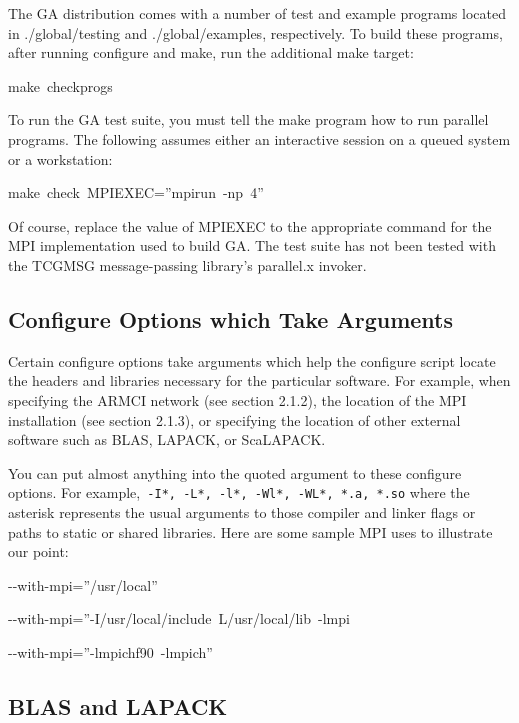 The GA distribution comes with a number of test and example programs
located in ./global/testing and ./global/examples, respectively. To
build these programs, after running configure and make, run the additional
make target: 
\begin{lyxcode}
make~checkprogs~
\end{lyxcode}
To run the GA test suite, you must tell the make program how to run
parallel programs. The following assumes either an interactive session
on a queued system or a workstation: 
\begin{lyxcode}
make~check~MPIEXEC=\textquotedblright{}mpirun~-np~4\textquotedblright{}~
\end{lyxcode}
Of course, replace the value of MPIEXEC to the appropriate command
for the MPI implementation used to build GA. The test suite has not
been tested with the TCGMSG message-passing library\textquoteright{}s
parallel.x invoker. 


\subsection{Configure Options which Take Arguments }

Certain configure options take arguments which help the configure
script locate the headers and libraries necessary for the particular
software. For example, when specifying the ARMCI network (see section
2.1.2), the location of the MPI installation (see section 2.1.3),
or specifying the location of other external software such as BLAS,
LAPACK, or ScaLAPACK. 

You can put almost anything into the quoted argument to these configure
options. For example,\texttt{ -I{*}, -L{*}, -l{*}, -Wl{*}, -WL{*},
{*}.a, {*}.so} where the asterisk represents the usual arguments to
those compiler and linker flags or paths to static or shared libraries.
Here are some sample MPI uses to illustrate our point:
\begin{lyxcode}
-{}-with-mpi=\textquotedblright{}/usr/local\textquotedblright{}~

-{}-with-mpi=\textquotedblright{}-I/usr/local/include~\textendash{}L/usr/local/lib~-lmpi\textquotedbl{}

-{}-with-mpi=\textquotedblright{}-lmpichf90~-lmpich\textquotedblright{}~
\end{lyxcode}

\subsection{BLAS and LAPACK }

